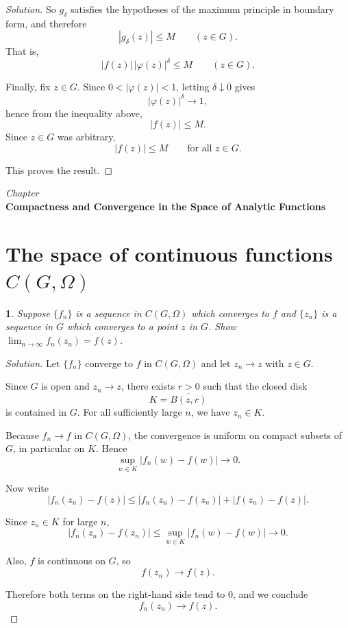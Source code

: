 \documentclass[12pt, a4paper]{report}
\newcommand{\chapter}[1]{%
  \par\vspace{2em}%
  \refstepcounter{section}%
  \begin{center}
    \textit{Chapter \thesection} \\[1.5ex]
    \textbf{#1}
  \end{center}
  \vspace{1em}%
}
\theoremstyle{spaced}
\newtheorem{exercise}{}
\newcommand{\setexercise}[1]{\setcounter{exercise}{#1-1}}
\begin{document}
\begin{proof}[Solution]
	So \(g_\delta\) satisfies the hypotheses of the maximum principle in boundary form, and therefore
	\[
		|g_\delta(z)|\le M \qquad (z\in G).
	\]
	That is,
	\[
		|f(z)|\,|\varphi(z)|^\delta \le M
		\qquad (z\in G).
	\]

	Finally, fix \(z\in G\). Since \(0<|\varphi(z)|<1\), letting \(\delta\downarrow 0\) gives
	\[
		|\varphi(z)|^\delta \to 1,
	\]
	hence from the inequality above,
	\[
		|f(z)|\le M.
	\]
	Since \(z\in G\) was arbitrary,
	\[
		|f(z)|\le M \qquad \text{for all } z\in G.
	\]

	This proves the result.
\end{proof}


\chapter{Compactness and Convergence in the Space of Analytic Functions}
\section{The space of continuous functions $C(G,\Omega)$}

\setexercise{5}
\begin{exercise}
	Suppose $\{f_n\}$ is a sequence in $C(G,\Omega)$ which converges to $f$ and $\{z_n\}$ is a sequence in $G$ which converges to a point $z$ in $G$.
	Show $\lim_{n\to\infty} f_n(z_n)=f(z)$.
\end{exercise}

\begin{proof}[Solution]
	Let $\{f_n\}$ converge to $f$ in $C(G,\Omega)$ and let $z_n \to z$ with $z \in G$.

	Since $G$ is open and $z_n \to z$, there exists $r>0$ such that the closed disk
	\[
		K=\overline{B(z,r)}
	\]
	is contained in $G$. For all sufficiently large $n$, we have $z_n \in K$.

	Because $f_n \to f$ in $C(G,\Omega)$, the convergence is uniform on compact subsets of $G$, in particular on $K$. Hence
	\[
		\sup_{w\in K} |f_n(w)-f(w)| \to 0.
	\]

	Now write
	\[
		|f_n(z_n)-f(z)|
		\le |f_n(z_n)-f(z_n)| + |f(z_n)-f(z)|.
	\]

	Since $z_n \in K$ for large $n$,
	\[
		|f_n(z_n)-f(z_n)| \le \sup_{w\in K}|f_n(w)-f(w)| \to 0.
	\]

	Also, $f$ is continuous on $G$, so
	\[
		f(z_n) \to f(z).
	\]

	Therefore both terms on the right-hand side tend to $0$, and we conclude
	\[
		f_n(z_n) \to f(z).
	\]
\end{proof}
\end{document}
